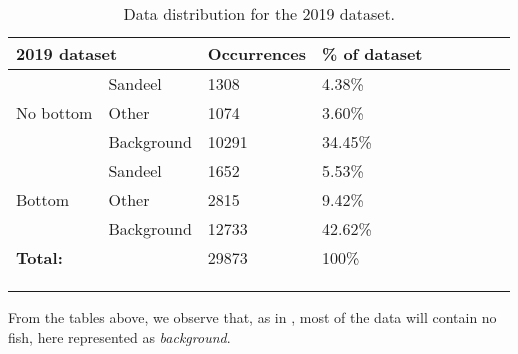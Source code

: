 \begin{longtable}{lllllllll}
\caption[2019 data distribution]{Data distribution for the 2019 dataset.}
\\ \cline{1-4}
\multicolumn{2}{|l|}{\textbf{2019 dataset}} & \multicolumn{1}{l|}{Occurrences} & \multicolumn{1}{l|}{\% of dataset} &  &  &  &  &  \\ \cline{1-4}
\endfirsthead
%
\endhead
%
                     & Sandeel              & 1308                             & 4.38\%                             &  &  &  &  &  \\
No bottom            & Other                & 1074                             & 3.60\%                             &  &  &  &  &  \\
                     & Background           & 10291                            & 34.45\%                            &  &  &  &  &  \\ \cline{1-4}
                     & Sandeel              & 1652                             & 5.53\%                             &  &  &  &  &  \\
Bottom               & Other                & 2815                             & 9.42\%                             &  &  &  &  &  \\
                     & Background           & 12733                            & 42.62\%                            &  &  &  &  &  \\ \cline{1-4}
\multicolumn{2}{l}{\textbf{Total:}}         & 29873                            & 100\%                              &  &  &  &  &  \\ \cline{1-4}
                     &                      &                                  &                                    &  &  &  &  &  \\
                     &                      &                                  &                                    &  &  &  &  & 
\\ \label{data_distribution_2019_table}
\end{longtable}  

        From the tables above, we observe that, as in \citeauthor{brautaset2020acoustic}\cite{brautaset2020acoustic}, most of the data will contain no fish, here represented as \textit{background}.

\clearpage
